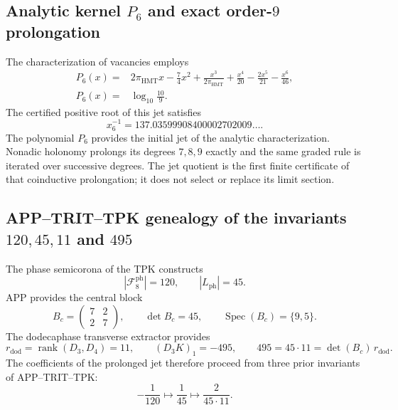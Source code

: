 \subsection{Analytic kernel \texorpdfstring{\(P_6\)}{P6} and exact order-\texorpdfstring{\(9\)}{9} prolongation}
\label{sec:l9s102:alpha-p6}

The characterization of vacancies employs
\begin{equation}
 \begin{aligned}
 P_6(x)={}&2\pi_{\mathrm{HMT}}x-\frac74x^2
 +\frac{x^3}{2\pi_{\mathrm{HMT}}}
 +\frac{x^4}{20}-\frac{2x^5}{21}-\frac{x^6}{46},\\
 P_6(x)={}&\log_{10}\frac{10}{9}.
 \end{aligned}
 \label{eq:l9s102:p6}
\end{equation}
The certified positive root of this jet satisfies
\begin{equation}
 x_6^{-1}=137.03599908400002702009\ldots .
 \label{eq:l9s102:raíz-p6}
\end{equation}
The polynomial \(P_6\) provides the initial jet of the analytic
characterization. Nonadic holonomy prolongs its degrees \(7,8,9\) exactly and
the same graded rule is iterated over successive degrees. The jet
quotient is the first finite certificate of that coinductive prolongation; it does not
select or replace its limit section.

\subsection{APP--TRIT--TPK genealogy of the invariants \texorpdfstring{\(120,45,11\)}{120, 45, 11} and \texorpdfstring{\(495\)}{495}}
\label{sec:l9s102:alpha-genealogia-7-9}

The phase semicorona of the TPK constructs
\begin{equation}
 |\mathcal F_8^{\mathrm{ph}}|=120,
 \qquad |L_{\mathrm{ph}}|=45.
 \label{eq:l9s102:alpha-120-45}
\end{equation}
APP provides the central block
\begin{equation}
 B_c=\begin{pmatrix}7&2\\2&7\end{pmatrix},
 \qquad
 \det B_c=45,
 \qquad
 \operatorname{Spec}(B_c)=\{9,5\}.
 \label{eq:l9s102:alpha-bc}
\end{equation}
The dodecaphase transverse extractor provides
\begin{equation}
 r_{\mathrm{dod}}=\operatorname{rank}(D_3,D_4)=11,
 \qquad
 (D_3K)_1=-495,
 \qquad
 495=45\cdot11=\det(B_c)\,r_{\mathrm{dod}}.
 \label{eq:l9s102:alpha-495}
\end{equation}
The coefficients of the prolonged jet therefore proceed from three
prior invariants of APP--TRIT--TPK:
\begin{equation}
 -\frac1{120}\longmapsto\frac1{45}
 \longmapsto\frac2{45\cdot11}.
 \label{eq:l9s102:alpha-coeficientes}
\end{equation}

